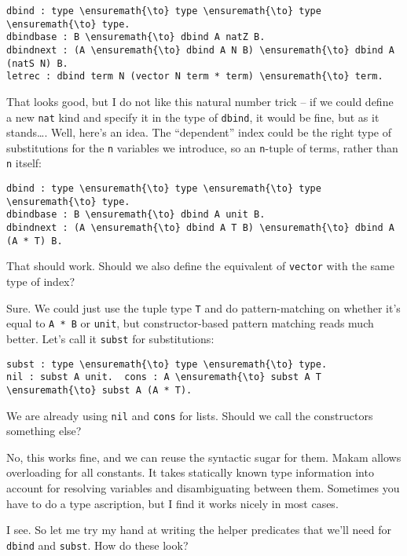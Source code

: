 \begin{verbatim}
dbind : type \ensuremath{\to} type \ensuremath{\to} type \ensuremath{\to} type. 
dbindbase : B \ensuremath{\to} dbind A natZ B.
dbindnext : (A \ensuremath{\to} dbind A N B) \ensuremath{\to} dbind A (natS N) B.
letrec : dbind term N (vector N term * term) \ensuremath{\to} term.
\end{verbatim}

\heroADVISOR{} That looks good, but I do not like this natural number trick --
if we could define a new \texttt{nat} kind and specify it in the type of
\texttt{dbind}, it would be fine, but as it stands\ldots{}. Well, here's
an idea. The ``dependent'' index could be the right type of
substitutions for the \texttt{n} variables we introduce, so an
\texttt{n}-tuple of terms, rather than \texttt{n} itself:

\begin{verbatim}
dbind : type \ensuremath{\to} type \ensuremath{\to} type \ensuremath{\to} type.
dbindbase : B \ensuremath{\to} dbind A unit B.
dbindnext : (A \ensuremath{\to} dbind A T B) \ensuremath{\to} dbind A (A * T) B.
\end{verbatim}

\heroSTUDENT{} That should work. Should we also define the equivalent of
\texttt{vector} with the same type of index?

\heroADVISOR{} Sure. We could just use the tuple type \texttt{T} and do
pattern-matching on whether it's equal to \texttt{A\ *\ B} or
\texttt{unit}, but constructor-based pattern matching reads much better.
Let's call it \texttt{subst} for substitutions:

\begin{verbatim}
subst : type \ensuremath{\to} type \ensuremath{\to} type.
nil : subst A unit.  cons : A \ensuremath{\to} subst A T \ensuremath{\to} subst A (A * T).
\end{verbatim}

\heroSTUDENT{} We are already using \texttt{nil} and \texttt{cons} for lists.
Should we call the constructors something else?

\heroADVISOR{} No, this works fine, and we can reuse the syntactic sugar for
them. Makam allows overloading for all constants. It takes statically
known type information into account for resolving variables and
disambiguating between them. Sometimes you have to do a type ascription,
but I find it works nicely in most cases.

\heroSTUDENT{} I see. So let me try my hand at writing the helper predicates
that we'll need for \texttt{dbind} and \texttt{subst}. How do these
look?

